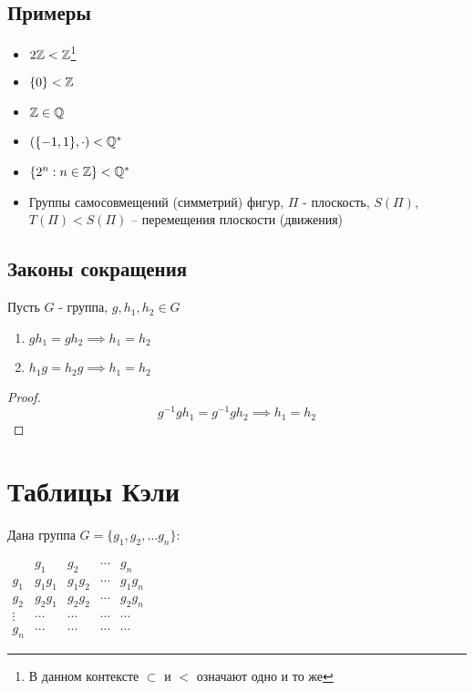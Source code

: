 \documentclass[main]{subfiles}
\begin{document}
\subsection{Примеры}
\begin{itemize}
    \item $2\mathbb{Z} < \mathbb{Z}$\footnote{В данном контексте $\subset$ и $<$ означают одно и то же}
    \item $\{0\}< \mathbb{Z}$
    \item $\mathbb{Z} \in \mathbb{Q}$
    \item $(\{-1, 1\}, \cdot) < \mathbb{Q}^*$
    \item $\{2^n: n \in \mathbb{Z}\} < \mathbb{Q}^*$
    \item Группы самосовмещений (симметрий) фигур, $\Pi$ - плоскость,
          $S(\Pi)$, $T(\Pi) < S(\Pi)$ -- перемещения плоскости (движения)
\end{itemize}

\subsection{Законы сокращения}
\begin{lemma}
    Пусть $G$ - группа, $g, h_1, h_2 \in G$
    \begin{enumerate}
        \item $gh_1 = gh_2 \implies h_1 = h_2$
        \item $h_1 g = h_2 g \implies h_1 = h_2$
    \end{enumerate}
\end{lemma}
\begin{proof}
    \[g^{-1}gh_1 = g^{-1}gh_2 \implies h_1 = h_2\]
\end{proof}

\section{Таблицы Кэли}
Дана группа $G = \{g_1, g_2, \ldots g_n\}$:

\begin{center}
    $\begin{array}{c|cccc}
                   & g_1     & g_2     & \cdots & g_n     \\
            \hline
            g_1    & g_1 g_1 & g_1 g_2 & \cdots & g_1 g_n \\
            g_2    & g_2 g_1 & g_2 g_2 & \cdots & g_2 g_n \\
            \vdots & \cdots  & \cdots  & \cdots & \cdots  \\
            g_n    & \cdots  & \cdots  & \cdots & \cdots
        \end{array}$
\end{center}
\end{document}
